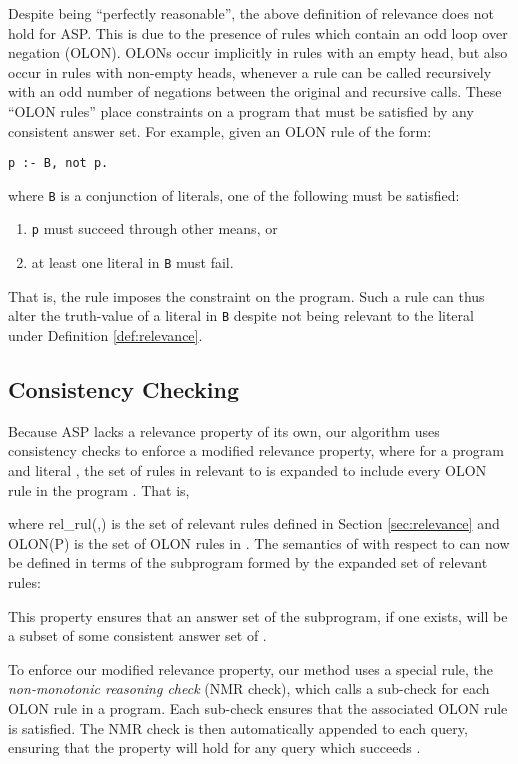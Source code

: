 \documentclass{new_tlp}
\begin{document}
Despite being ``perfectly reasonable'', the above definition of relevance does
not hold for ASP. This is due to the presence of rules which contain an odd
loop over negation (OLON). OLONs occur implicitly in rules with an empty head,
but also occur in rules with non-empty heads, whenever a rule can be called
recursively with an odd number of negations between the original and recursive
calls. These ``OLON rules'' place constraints on a program that must be
satisfied by any consistent answer set. For example, given an OLON rule of the
form:
\begin{verbatim}
p :- B, not p.
\end{verbatim}
where \texttt{B} is a conjunction of literals, one of the following 
must be satisfied:
\begin{enumerate}
\item \texttt{p} must succeed through other means, or
\item at least one literal in \texttt{B} must fail.
\end{enumerate}
That is, the rule imposes the constraint  on the program. Such a
rule can thus alter the truth-value of a literal in \texttt{B} despite not
being relevant to the literal under Definition \ref{def:relevance}.


\subsection{Consistency Checking} \label{sec:consistency}

Because ASP lacks a relevance property of its own, our algorithm uses
consistency checks to enforce a modified relevance property, where for a
program  and literal , the set of rules in  relevant to  is
expanded to include every OLON rule in the program \cite{goalasp}. That is,


\noindent where rel\_rul(,) is the set of relevant rules defined in 
Section \ref{sec:relevance} and OLON(P) is the set of OLON rules in . The 
semantics of  with respect to  can now be defined in terms of the
subprogram formed by the expanded set of relevant rules:


\noindent This property ensures that an answer set of the subprogram, if one
exists, will be a subset of some consistent answer set of  \cite{goalasp}.

To enforce our modified relevance property, our method uses a special rule, the
\textit{non-monotonic reasoning check} (NMR check), which calls a sub-check for
each OLON rule in a program. Each sub-check ensures that the associated OLON
rule is satisfied. The NMR check is then automatically appended to each query,
ensuring that the property will hold for any query which succeeds
\cite{goalasp}.
\end{document}
